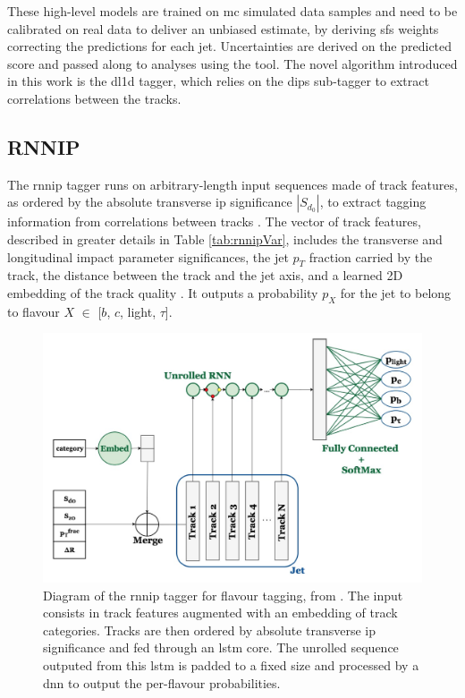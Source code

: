 These high-level models are trained on \gls{mc} simulated data samples and need to be calibrated on real data to deliver an unbiased estimate, by deriving \glspl{sf} weights correcting the predictions for each jet. Uncertainties are derived on the predicted score and passed along to analyses using the tool. The novel algorithm introduced in this work is the \gls{dl1d} tagger, which relies on the \gls{dips} sub-tagger to extract correlations between the tracks.  

\subsection{RNNIP}
The \gls{rnnip} tagger runs on arbitrary-length input sequences made of track features, as ordered by the absolute transverse \gls{ip} significance $|S_{d_0}|$, to extract tagging information from correlations between tracks \cite{ATL-PHYS-PUB-2017-003}. The vector of track features, described in greater details in Table \ref{tab:rnnipVar}, includes the transverse and longitudinal impact parameter significances, the jet $p_T$ fraction carried by the track, the distance between the track and the jet axis, and a learned 2D embedding of the track quality \cite{Paganini:2289214}. It outputs a probability $p_X$ for the jet to belong to flavour $X$ $\in$ [$b$, $c$, light, $\tau$].

\begin{figure}[h!]
  \center
  \includegraphics[scale=0.6]{Images/FTAG/rnnip_structure.png}
  \caption{Diagram of the \gls{rnnip} tagger for flavour tagging, from \cite{Paganini:2289214}. The input consists in track features augmented with an embedding of track categories. Tracks are then ordered by absolute transverse \gls{ip} significance and fed through an \gls{lstm} core. The unrolled sequence outputed from this \gls{lstm} is padded to a fixed size and processed by a \gls{dnn} to output the per-flavour probabilities.} 
  \label{fig:rnnipModel}
\end{figure}


